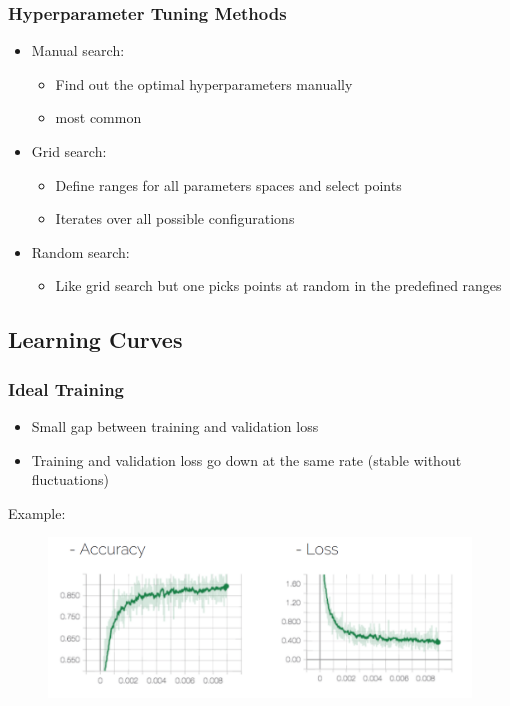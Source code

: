 \documentclass[10pt,a4paper]{article}
\begin{document}
\subsubsection{Hyperparameter Tuning Methods}
\begin{itemize}
	\item Manual search:
	\begin{itemize}
		\item Find out the optimal hyperparameters manually
		\item most common
	\end{itemize}
	\item Grid search:
	\begin{itemize}
		\item Define ranges for all parameters spaces and select points
		\item Iterates over all possible configurations
	\end{itemize}
	\item Random search:
	\begin{itemize}
		\item Like grid search but one picks points at random in the predefined ranges
	\end{itemize}
\end{itemize}

\subsection{Learning Curves}
\subsubsection{Ideal Training}
\begin{itemize}
	\item Small gap between training and validation loss
	\item Training and validation loss go down at the same rate (stable without fluctuations)
\end{itemize}

Example:
\begin{figure}[H]
	\includegraphics[width=\columnwidth]{figures/l_curves.png}
\end{figure}
\end{document}
